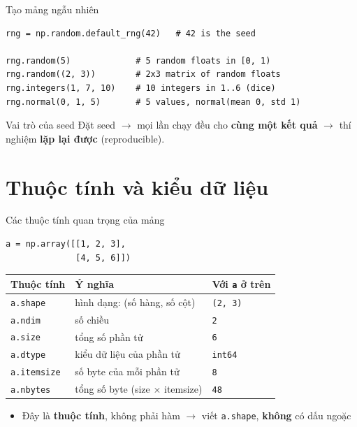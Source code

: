 \documentclass[11pt]{beamer}
\begin{document}
\begin{frame}[fragile]{Tạo mảng ngẫu nhiên}
\begin{lstlisting}
rng = np.random.default_rng(42)   # 42 is the seed

rng.random(5)             # 5 random floats in [0, 1)
rng.random((2, 3))        # 2x3 matrix of random floats
rng.integers(1, 7, 10)    # 10 integers in 1..6 (dice)
rng.normal(0, 1, 5)       # 5 values, normal(mean 0, std 1)
\end{lstlisting}
\begin{block}{Vai trò của seed}
Đặt seed $\to$ mọi lần chạy đều cho \textbf{cùng một kết quả} $\to$ thí nghiệm \textbf{lặp lại được} (reproducible).
\end{block}
\end{frame}

\section{Thuộc tính và kiểu dữ liệu}

\begin{frame}[fragile]{Các thuộc tính quan trọng của mảng}
\begin{lstlisting}
a = np.array([[1, 2, 3],
              [4, 5, 6]])
\end{lstlisting}
\begin{center}
\small
\begin{tabular}{|l|l|l|}
\hline
\textbf{Thuộc tính} & \textbf{Ý nghĩa} & \textbf{Với \texttt{a} ở trên} \\
\hline
\texttt{a.shape}    & hình dạng: (số hàng, số cột) & \texttt{(2, 3)} \\
\texttt{a.ndim}     & số chiều                     & \texttt{2} \\
\texttt{a.size}     & tổng số phần tử              & \texttt{6} \\
\texttt{a.dtype}    & kiểu dữ liệu của phần tử     & \texttt{int64} \\
\texttt{a.itemsize} & số byte của mỗi phần tử      & \texttt{8} \\
\texttt{a.nbytes}   & tổng số byte (size $\times$ itemsize) & \texttt{48} \\
\hline
\end{tabular}
\end{center}
\begin{itemize}
  \item Đây là \textbf{thuộc tính}, không phải hàm $\to$ viết \texttt{a.shape}, \textbf{không} có dấu ngoặc
\end{itemize}
\end{frame}
\end{document}
